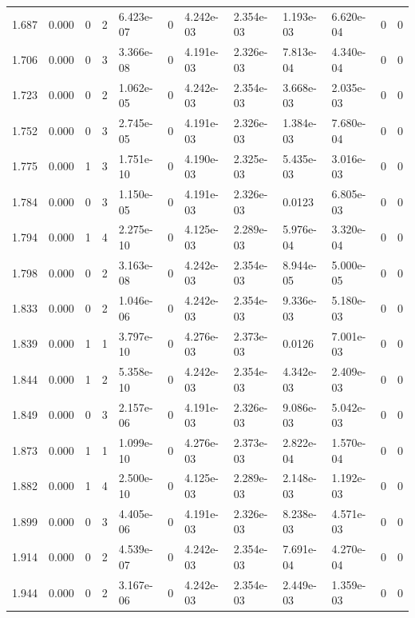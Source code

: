 \documentclass[preview]{standalone}
\begin{document}
{{{\begin{tabular}{L{1.2cm}C{1.2cm} C{0.3cm}C{0.5cm} C{1.4cm}C{1.4cm} C{1.4cm}C{1.4cm} C{1.6cm}C{1.6cm} C{1.6cm}C{1.6cm}}
  1.687  &  0.000  & 0     &  2 &  6.423e-07  & 0  &  4.242e-03&   2.354e-03& 1.193e-03 & 6.620e-04   &  0 & 0  \\ 
  1.706  &  0.000  & 0     &  3 &  3.366e-08  & 0  &  4.191e-03&   2.326e-03& 7.813e-04 & 4.340e-04   &  0 & 0  \\ 
  1.723  &  0.000  & 0     &  2 &  1.062e-05  & 0  &  4.242e-03&   2.354e-03& 3.668e-03 & 2.035e-03   &  0 & 0  \\ 
  1.752  &  0.000  & 0     &  3 &  2.745e-05  & 0  &  4.191e-03&   2.326e-03& 1.384e-03 & 7.680e-04   &  0 & 0  \\ 
  1.775  &  0.000  & 1     &  3 &  1.751e-10  & 0  &  4.190e-03&   2.325e-03& 5.435e-03 & 3.016e-03   &  0 & 0  \\ 
  1.784  &  0.000  & 0     &  3 &  1.150e-05  & 0  &  4.191e-03&   2.326e-03& 0.0123 & 6.805e-03   &  0 & 0  \\ 
  1.794  &  0.000  & 1     &  4 &  2.275e-10  & 0  &  4.125e-03&   2.289e-03& 5.976e-04 & 3.320e-04   &  0 & 0  \\ 
  1.798  &  0.000  & 0     &  2 &  3.163e-08  & 0  &  4.242e-03&   2.354e-03& 8.944e-05 & 5.000e-05   &  0 & 0  \\ 
  1.833  &  0.000  & 0     &  2 &  1.046e-06  & 0  &  4.242e-03&   2.354e-03& 9.336e-03 & 5.180e-03   &  0 & 0  \\ 
  1.839  &  0.000  & 1     &  1 &  3.797e-10  & 0  &  4.276e-03&   2.373e-03& 0.0126 & 7.001e-03   &  0 & 0  \\ 
  1.844  &  0.000  & 1     &  2 &  5.358e-10  & 0  &  4.242e-03&   2.354e-03& 4.342e-03 & 2.409e-03   &  0 & 0  \\ 
  1.849  &  0.000  & 0     &  3 &  2.157e-06  & 0  &  4.191e-03&   2.326e-03& 9.086e-03 & 5.042e-03   &  0 & 0  \\ 
  1.873  &  0.000  & 1     &  1 &  1.099e-10  & 0  &  4.276e-03&   2.373e-03& 2.822e-04 & 1.570e-04   &  0 & 0  \\ 
  1.882  &  0.000  & 1     &  4 &  2.500e-10  & 0  &  4.125e-03&   2.289e-03& 2.148e-03 & 1.192e-03   &  0 & 0  \\ 
  1.899  &  0.000  & 0     &  3 &  4.405e-06  & 0  &  4.191e-03&   2.326e-03& 8.238e-03 & 4.571e-03   &  0 & 0  \\ 
  1.914  &  0.000  & 0     &  2 &  4.539e-07  & 0  &  4.242e-03&   2.354e-03& 7.691e-04 & 4.270e-04   &  0 & 0  \\ 
  1.944  &  0.000  & 0     &  2 &  3.167e-06  & 0  &  4.242e-03&   2.354e-03& 2.449e-03 & 1.359e-03   &  0 & 0  \\ 

\end{tabular}}}}
\end{document}
